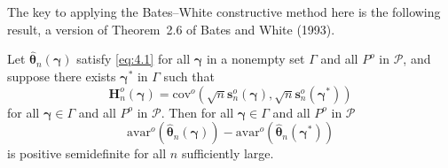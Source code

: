The key to applying the Bates--White constructive method here is the
following result, a version of Theorem~2.6 of Bates and White (1993).

\begin{proposition}\label{prop:4.55}
Let $\hat{\boldsymbol{\theta}}_n(\boldsymbol{\gamma})$ satisfy \eqref{eq:4.1} for all $\boldsymbol{\gamma}$ in a nonempty set $\Gamma$ and all $P^o$ in $\mathcal{P}$, and suppose there exists $\boldsymbol{\gamma}^*$ in $\Gamma$ such that
\begin{equation}\label{eq:4.2}
\mathbf{H}_n^o(\boldsymbol{\gamma}) = \mathrm{cov}^o\left(\sqrt{n}\mathbf{s}_n^o(\boldsymbol{\gamma}), \sqrt{n}\mathbf{s}_n^o(\boldsymbol{\gamma}^*)\right)
\end{equation}
for all $\boldsymbol{\gamma} \in \Gamma$ and all $P^o$ in $\mathcal{P}$. Then for all $\boldsymbol{\gamma} \in \Gamma$ and all $P^o$ in $\mathcal{P}$
\[
\mathrm{avar}^o\left(\hat{\boldsymbol{\theta}}_n(\boldsymbol{\gamma})\right) - \mathrm{avar}^o\left(\hat{\boldsymbol{\theta}}_n(\boldsymbol{\gamma}^*)\right)
\]
is positive semidefinite for all $n$ sufficiently large.
\end{proposition}


